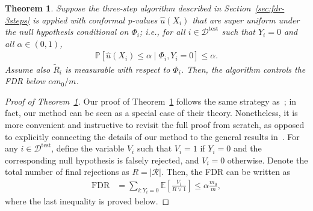 \documentclass[11pt]{article}
\newtheorem{theorem}{Theorem}
\renewcommand{\P}[1]{\mathbb{P}\left[#1\right]}
\newcommand{\E}[1]{\mathbb{E}\left[#1\right]}
\begin{document}
\begin{theorem} \label{theorem:fdr-general}
Suppose the three-step algorithm described in Section~\ref{sec:fdr-3steps} is applied with conformal p-values $\hat{u}(X_i)$ that are super uniform under the null hypothesis conditional on $\Phi_i$; i.e., for all $i \in \mathcal{D}^{\mathrm{test}}$ such that $Y_i=0$ and all $\alpha \in(0,1)$,
\begin{align*}
  \P{\hat{u}(X_i) \leq \alpha \mid \Phi_i, Y_i = 0} \leq \alpha.
\end{align*}
Assume also $\tilde{R}_i$ is measurable with respect to $\Phi_i$. Then, the algorithm controls the FDR below $\alpha m_0/m$.
\end{theorem}

\begin{proof}[Proof of Theorem~\ref{theorem:fdr-general}]
Our proof of Theorem~\ref{theorem:fdr-general} follows the same strategy as~\cite{fithian2020conditional}; in fact, our method can be seen as a special case of their theory.
Nonetheless, it is more convenient and instructive to revisit the full proof from scratch, as opposed to explicitly connecting the details of our method to the general results in~\cite{fithian2020conditional}.
For any $i \in \mathcal{D}^{\mathrm{test}}$, define the variable $V_i$ such that $V_i=1$ if $Y_i=0$ and the corresponding null hypothesis is falsely rejected, and $V_i=0$ otherwise.
Denote the total number of final rejections as $R = |\mathcal{R}|$.
Then, the FDR can be written as
\begin{align*}
  \text{FDR}
  & = \sum_{i : Y_i=0} \E{ \frac{V_i}{R \lor 1} } \leq \alpha \frac{m_0}{m},
\end{align*}
where the last inequality is proved below.


\end{proof}
\end{document}
